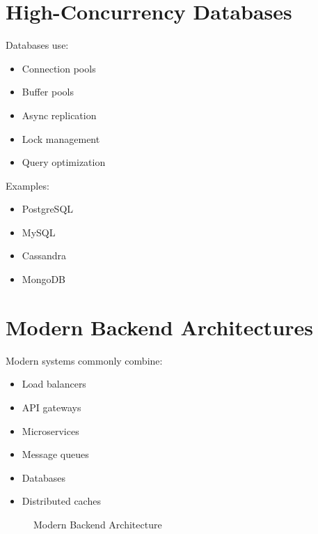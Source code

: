 \section{High-Concurrency Databases}

Databases use:

\begin{itemize}
\item Connection pools
\item Buffer pools
\item Async replication
\item Lock management
\item Query optimization
\end{itemize}

Examples:

\begin{itemize}
\item PostgreSQL
\item MySQL
\item Cassandra
\item MongoDB
\end{itemize}

\section{Modern Backend Architectures}

Modern systems commonly combine:

\begin{itemize}
\item Load balancers
\item API gateways
\item Microservices
\item Message queues
\item Databases
\item Distributed caches
\end{itemize}

\begin{figure}[H]
\centering
{}
\caption{Modern Backend Architecture}
\end{figure}

